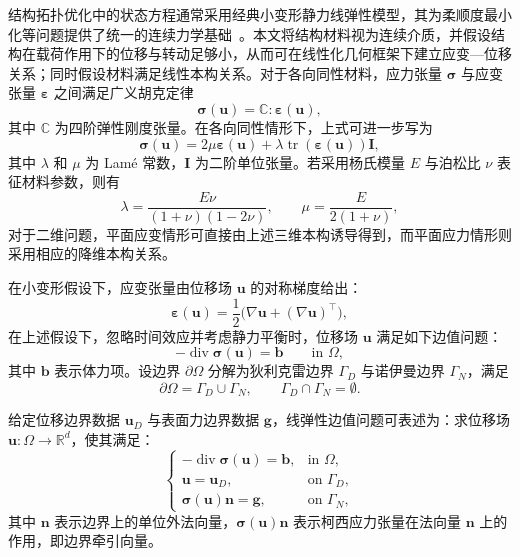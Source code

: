 结构拓扑优化中的状态方程通常采用经典小变形静力线弹性模型，其为柔顺度最小化等问题提供了统一的连续力学基础~\cite{bendsoeTopologyOptimization2004a}。本文将结构材料视为连续介质，并假设结构在载荷作用下的位移与转动足够小，从而可在线性化几何框架下建立应变—位移关系；同时假设材料满足线性本构关系。对于各向同性材料，应力张量 $\boldsymbol{\sigma}$ 与应变张量 $\boldsymbol{\varepsilon}$ 之间满足广义胡克定律
\[
\boldsymbol{\sigma}(\boldsymbol{u}) = \mathbb{C}:\boldsymbol{\varepsilon}(\boldsymbol{u}),
\]
其中 $\mathbb{C}$ 为四阶弹性刚度张量。在各向同性情形下，上式可进一步写为
\begin{equation}
	\boldsymbol{\sigma}(\boldsymbol{u}) = 2\mu \boldsymbol{\varepsilon}(\boldsymbol{u}) + \lambda \operatorname{tr}(\boldsymbol{\varepsilon}(\boldsymbol{u}))\boldsymbol{I},
	\label{eq:ch3_constitutive_equation}
\end{equation}
其中 $\lambda$ 和 $\mu$ 为 Lamé 常数，$\boldsymbol{I}$ 为二阶单位张量。若采用杨氏模量 $E$ 与泊松比 $\nu$ 表征材料参数，则有
\[
\lambda = \frac{E\nu}{(1+\nu)(1-2\nu)}, \qquad \mu = \frac{E}{2(1+\nu)},
\]
对于二维问题，平面应变情形可直接由上述三维本构诱导得到，而平面应力情形则采用相应的降维本构关系。

在小变形假设下，应变张量由位移场 $\boldsymbol{u}$ 的对称梯度给出：
\[
\boldsymbol{\varepsilon}(\boldsymbol{u}) = \frac{1}{2}\bigl(\nabla\boldsymbol{u} + (\nabla\boldsymbol{u})^{\top}\bigr),
\]
在上述假设下，忽略时间效应并考虑静力平衡时，位移场 $\boldsymbol{u}$ 满足如下边值问题：
\begin{equation}
	-\operatorname{div}\boldsymbol{\sigma}(\boldsymbol{u})=\boldsymbol{b} \qquad \text{in } \Omega,
	\label{eq:ch3_equilibrium_equation}
\end{equation}
其中 $\boldsymbol{b}$ 表示体力项。设边界 $\partial\Omega$ 分解为狄利克雷边界 $\Gamma_D$ 与诺伊曼边界 $\Gamma_N$，满足
\[
\partial\Omega=\Gamma_D\cup\Gamma_N, \qquad \Gamma_D\cap\Gamma_N=\emptyset.
\]

给定位移边界数据 $\boldsymbol{u}_D$ 与表面力边界数据 $\boldsymbol{g}$，线弹性边值问题可表述为：求位移场 $\boldsymbol{u}:\Omega\to\mathbb{R}^d$，使其满足：
\begin{equation}
	\begin{cases}
		-\operatorname{div}\boldsymbol{\sigma}(\boldsymbol{u}) = \boldsymbol{b}, & \text{in } \Omega, \\
		\boldsymbol{u} = \boldsymbol{u}_D, & \text{on } \Gamma_D, \\
		\boldsymbol{\sigma}(\boldsymbol{u})\boldsymbol{n} = \boldsymbol{g}, & \text{on } \Gamma_N,
	\end{cases}
	\label{eq:ch3_elastic_strong}
\end{equation}
其中 $\boldsymbol{n}$ 表示边界上的单位外法向量，$\boldsymbol{\sigma}(\boldsymbol{u})\boldsymbol{n}$ 表示柯西应力张量在法向量 $\boldsymbol{n}$ 上的作用，即边界牵引向量。


